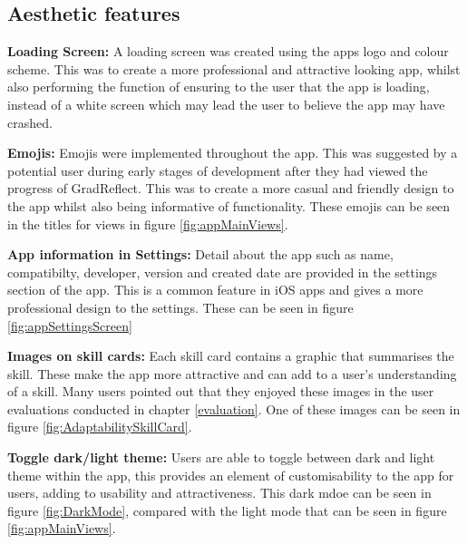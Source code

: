 \documentclass{l4proj}
\begin{document}
\subsection{Aesthetic features}

\textbf{Loading Screen:} A loading screen was created using the apps logo and colour scheme. This was to create a more professional and attractive looking app, whilst also performing the function of ensuring to the user that the app is loading, instead of a white screen which may lead the user to believe the app may have crashed.

\textbf{Emojis:} Emojis were implemented throughout the app. This was suggested by a potential user during early stages of development after they had viewed the progress of GradReflect. This was to create a more casual and friendly design to the app whilst also being informative of functionality. These emojis can be seen in the titles for views in figure \ref{fig:appMainViews}.

\textbf{App information in Settings:} Detail about the app such as name, compatibilty, developer, version and created date are provided in the settings section of the app. This is a common feature in iOS apps and gives a more professional design to the settings. These can be seen in figure \ref{fig:appSettingsScreen}

\textbf{Images on skill cards:} Each skill card contains a graphic that summarises the skill. These make the app more attractive and can add to a user's understanding of a skill. Many users pointed out that they enjoyed these images in the user evaluations conducted in chapter \ref{evaluation}. One of these images can be seen in figure \ref{fig:AdaptabilitySkillCard}.

\textbf{Toggle dark/light theme:} Users are able to toggle between dark and light theme within the app, this provides an element of customisability to the app for users, adding to usability and attractiveness. This dark mdoe can be seen in figure \ref{fig:DarkMode}, compared with the light mode that can be seen in figure \ref{fig:appMainViews}. 
\end{document}
